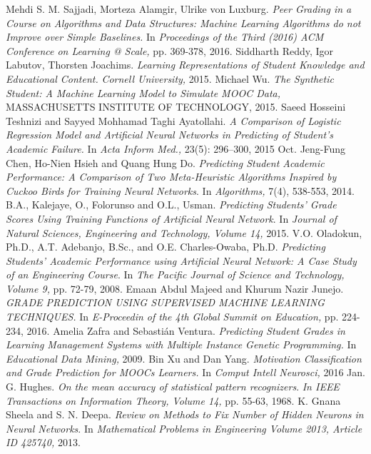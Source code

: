 \clearpage
{}

\begin{thebibliography}{99}
		{Mehdi S. M. Sajjadi, Morteza Alamgir, Ulrike von Luxburg. \emph{Peer Grading in a Course on Algorithms and Data Structures: Machine Learning Algorithms do not Improve over Simple Baselines.} In \emph{Proceedings of the Third (2016) ACM Conference on Learning @ Scale,} pp. 369-378, 2016.}
		{Siddharth Reddy, Igor Labutov, Thorsten Joachims. \emph{Learning Representations of Student Knowledge and Educational Content.} \emph{Cornell University,} 2015.}
		{Michael Wu. \emph{The Synthetic Student: A Machine Learning Model to Simulate MOOC Data,} MASSACHUSETTS INSTITUTE OF TECHNOLOGY, 2015.}
		{Saeed Hosseini Teshnizi and Sayyed Mohhamad Taghi Ayatollahi. \emph{A Comparison of Logistic Regression Model and Artificial Neural Networks in Predicting of Student’s Academic Failure.} In \emph{Acta Inform Med., } 23(5): 296–300, 2015 Oct.}
		{Jeng-Fung Chen, Ho-Nien Hsieh and Quang Hung Do. \emph{Predicting Student Academic Performance: A Comparison of Two Meta-Heuristic Algorithms Inspired by Cuckoo Birds for Training Neural Networks}. In \emph{Algorithms,} 7(4), 538-553, 2014.}
		{B.A., Kalejaye, O., Folorunso and O.L., Usman. \emph{Predicting Students' Grade Scores Using Training Functions of Artificial Neural Network}. In \emph{Journal of Natural Sciences, Engineering and Technology, Volume 14,} 2015.}
		{V.O. Oladokun, Ph.D., A.T. Adebanjo, B.Sc., and O.E. Charles-Owaba, Ph.D. \emph{Predicting Students’ Academic Performance using Artificial Neural Network: A Case Study of an Engineering Course}. In \emph{The Pacific Journal of Science and Technology, Volume 9,} pp. 72-79, 2008.}
		{Emaan Abdul Majeed and Khurum Nazir Junejo. \emph{GRADE PREDICTION USING SUPERVISED MACHINE LEARNING TECHNIQUES.} In \emph{E-Proceedin of the 4th Global Summit on Education,} pp. 224-234, 2016.}
		{Amelia Zafra and Sebastián Ventura. \emph{Predicting Student Grades in Learning Management 
		Systems with Multiple Instance Genetic Programming.} In \emph{Educational Data Mining,} 2009.}
		{Bin Xu and Dan Yang. \emph{Motivation Classification and Grade Prediction for MOOCs Learners.} In \emph{Comput Intell Neurosci,} 2016 Jan.}
		{G. Hughes. \emph{On the mean accuracy of statistical pattern recognizers}. \emph{In IEEE Transactions on Information Theory, Volume 14,} pp. 55-63, 1968.}
		{K. Gnana Sheela and S. N. Deepa. \emph{Review on Methods to Fix Number of Hidden Neurons in Neural Networks}. In \emph{Mathematical Problems in Engineering Volume 2013, Article ID 425740,} 2013.}
\end{thebibliography}
